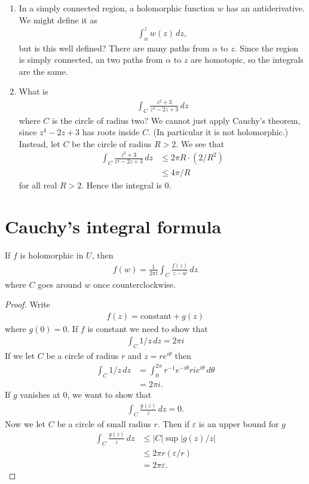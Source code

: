 \documentclass[11pt, oneside,margin=1in]{article}
\begin{document}
\begin{enumerate}
	\item In a simply connected region, a holomorphic function $w$ has an antiderivative. We might define it as
		\begin{align*}
			\int_{\alpha}^{z} w(z)  \, dz, 
		\end{align*}
		but is this well defined? There are many paths from $\alpha$ to $z$. Since the region is simply connected, an two paths from $\alpha$ to $z$ are homotopic, so the integrals are the same. 
	\item What is 
		\begin{align*}
			\int_{C}^{} \frac{z^2+3}{z^4-2z+3}  \, dz 
		\end{align*}
		where $C$ is the circle of radius two? We cannot just apply Cauchy's theorem, since $z^4-2z+3$ has roots inside $C$. (In particular it is not holomorphic.) Instead, let $C$ be the circle of radius $R>2$. We see that
		\begin{align*}
			\int_{C}^{} \frac{z^2 + 3}{z^4-2z+3}  \, dz &\le 2\pi R \cdot (2/R^2) \\
								    &\le 4\pi/R
		\end{align*}
		for all real $R>2$. Hence the integral is $0$.
\end{enumerate}
\section{Cauchy's integral formula}
If $f$ is holomorphic in $U$, then 
\begin{align*}
	f(w)=  \frac{1}{2\pi i} \int_{C}^{} \frac{f(z)}{z-w}  \, dz 
\end{align*}
where $C$ goes around $w$ once counterclockwise. 
\begin{proof}
Write
\begin{align*}
	f(z) = \textrm{constant} + g (z)
\end{align*}
where $g(0)=0$. If $f$ is constant we need to show that
\begin{align*}
	\int_{C}^{} 1/z  \, dz = 2\pi i 
\end{align*}
If we let $C$ be a circle of radius $r$ and $z=re^{i\theta}$ then
\begin{align*}
	\int_{C}^{} 1/z  \, dz &= \int_{0}^{2\pi} r^{-1}e^{-i\theta} r ie^{i\theta}  \, d\theta\\
			       &= 2\pi i.
\end{align*}
If $g$ vanishes at $0$, we want to show that 
\begin{align*}
	\int_{C}^{} \frac{g(z)}{z}  \, dz = 0. 
\end{align*}
Now we let $C$ be a circle of small radius $r$. Then if $\varepsilon$ is an upper bound for $g$
\begin{align*}
	\int_{C}^{} \frac{g(z)}{z}  \, dz & \le \left\lvert C \right\rvert \sup \left\lvert g(z)/z \right\rvert \\
					  &\le 2\pi r (\varepsilon/r) \\
					  &=2\pi \varepsilon.
\end{align*}
\end{proof}
\end{document}
